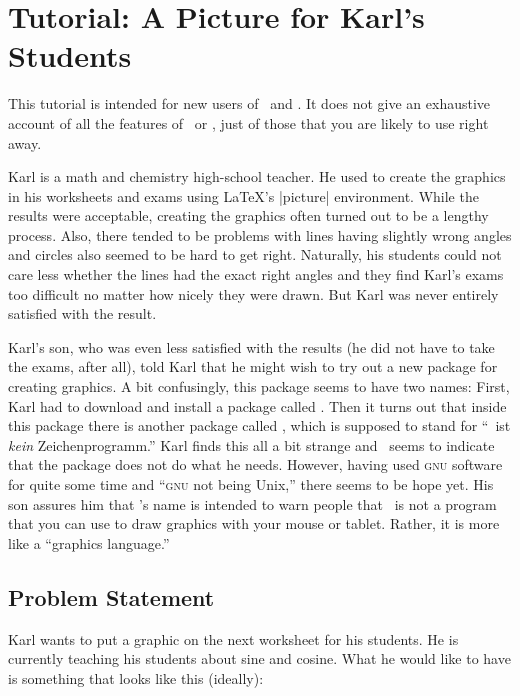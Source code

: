 \section{Tutorial: A Picture for Karl's Students}

This tutorial is intended for new users of \pgfname\ and \tikzname. It
does not give an exhaustive account of all the features of \tikzname\ or
\pgfname, just of those that you are likely to use right away.

Karl is a math and chemistry high-school teacher. He used to create
the graphics in his worksheets and exams using \LaTeX's |{picture}|
environment. While the results were acceptable, creating the graphics
often turned out to be a lengthy process. Also, there tended to be
problems with lines having slightly wrong angles and circles also
seemed to be hard to get right. Naturally, his students could not care
less whether the lines had the exact right angles and they find
Karl's exams too difficult no matter how nicely they were drawn. But
Karl was never entirely satisfied with the result.

Karl's son, who was even less satisfied with the results (he did not
have to take the exams, after all),  told Karl that he might wish
to try out a new package for creating graphics. A bit confusingly,
this package seems to have two names: First, Karl had to download and 
install a package called \pgfname. Then it turns out that inside this
package there is another package called \tikzname, which is supposed to
stand for ``\tikzname\ ist \emph{kein}  Zeichenprogramm.'' Karl finds this
all a bit strange and \tikzname\ seems to indicate that the package
does not do what he needs. However, having used \textsc{gnu}
software for quite some time and ``\textsc{gnu} not being Unix,''
there seems to be hope yet. His son assures him that \tikzname's name is
intended to warn people that \tikzname\ is not a program that you can
use to draw graphics with your mouse or tablet. Rather, it is more
like a ``graphics language.''


\subsection{Problem Statement}

Karl wants to put a graphic on the next worksheet for his
students. He is currently teaching his students about sine and
cosine. What he would like to have is something that looks like this
(ideally):

